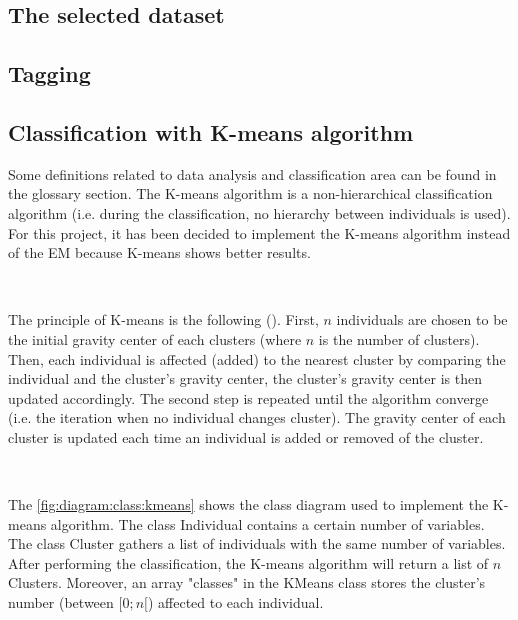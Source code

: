 \subsection{The selected dataset}



\subsection{Tagging}





\subsection{Classification with K-means algorithm}

Some definitions related to \gls{data analysis} and \gls{classification} area can be found in the glossary section. The K-means \gls{algorithm} is a non-hierarchical \gls{classification} \gls{algorithm} (i.e. during the \gls{classification}, no hierarchy between \glspl{individual} is used). For this project, it has been decided to implement the K-means \gls{algorithm} instead of the \gls{EM} because K-means shows better results. 

~~ 

The principle of K-means is the following (\cite{bib:clustering:AnalyseDesDonnees}). First, $n$ \glspl{individual} are chosen to be the initial gravity center of each \glspl{cluster} (where $n$ is the number of clusters). Then, each individual is affected (added) to the nearest \gls{cluster} by comparing the \gls{individual} and the \gls{cluster}'s gravity center, the \gls{cluster}'s gravity center is then  updated accordingly. The second step is repeated until the \gls{algorithm} converge (i.e. the iteration when no \gls{individual} changes \gls{cluster}). The gravity center of each \gls{cluster} is updated each time an \gls{individual} is added or removed of the \gls{cluster}.

~~

The \vref{fig:diagram:class:kmeans} shows the class diagram used to implement the K-means \gls{algorithm}. The class Individual contains a certain number of variables. The class Cluster gathers a list of individuals with the same number of variables. After performing the classification, the K-means \gls{algorithm} will return a list of $n$ Clusters. Moreover, an array "classes" in the KMeans class stores the \gls{cluster}'s number (between $[0;n[$) affected to each \gls{individual}.


